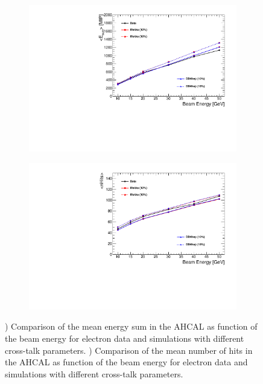 \begin{figure}[htbp!]
  \centering
  \begin{subfigure}[t]{0.49\textwidth}
    \includegraphics[width=1.\linewidth]{../Thesis_Plots/Timing/Electrons/Plots/EsumElectrons_BeamEnergy.pdf}
    \caption{} \label{fig:EsumMeanElectron}
  \end{subfigure}
  \hfill
  \begin{subfigure}[t]{0.49\textwidth}
    \includegraphics[width=1.\linewidth]{../Thesis_Plots/Timing/Electrons/Plots/nHitsElectrons_BeamEnergy.pdf}
    \caption{} \label{fig:nHitsMeanElectron}
  \end{subfigure}
  \caption{) Comparison of the mean energy sum in the AHCAL as function of the beam energy for electron data and simulations with different cross-talk parameters. ) Comparison of the mean number of hits in the AHCAL as function of the beam energy for electron data and simulations with different cross-talk parameters.}
  \label{fig:eVal}
\end{figure}


